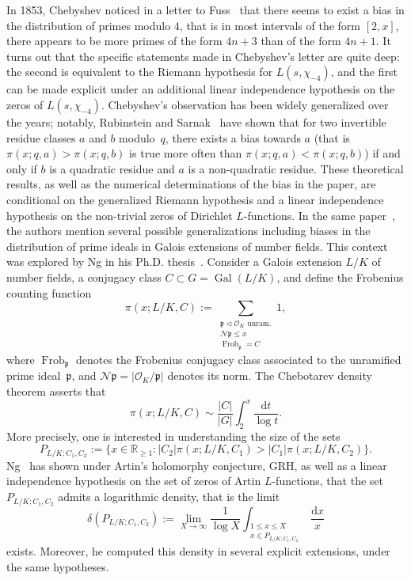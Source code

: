 \documentclass[10pt]{amsart}
\let\mathcal\mathscr
\DeclareMathOperator{\Frob}{Frob}
\theoremstyle{definition}
\DeclareMathOperator{\Gal}{Gal}
\renewcommand{\d}{\mathrm{d}}
\begin{document}
In 1853, Chebyshev noticed in a letter to Fuss~\cite{Ch} that there seems to exist a bias in the distribution of primes modulo $4$, that is in most intervals of the form $[2,x]$, there appears to be more primes of the form $4n+3$ than of the form $4n+1$.
It turns out that the specific statements made in Chebyshev's letter are quite deep: the second is equivalent to the Riemann hypothesis for $L(s,\chi_{-4})$, and the first can be made explicit under an additional linear independence hypothesis on the zeros of $L(s,\chi_{-4})$.
Chebyshev's observation has been widely generalized over the years; notably, Rubinstein and Sarnak~\cite{RS} have shown that for two invertible residue classes $a$ and $b$ modulo~$q$, there exists a bias towards $a$ (that is $\pi(x;q,a)>\pi(x;q,b)$ is true more often than $\pi(x;q,a)<\pi(x;q,b)$) if and only if $b$ is a quadratic residue and $a$ is a non-quadratic residue. These theoretical results, as well as the numerical determinations of the bias in the paper, are conditional on the generalized Riemann hypothesis and a linear independence hypothesis on the non-trivial zeros of Dirichlet $L$-functions. In the same paper~\cite[\S 5]{RS}, the authors mention several possible generalizations including biases in the distribution of prime ideals in Galois extensions of number fields. This context was explored by Ng in his Ph.D. thesis~\cite{Ng}.
Consider a Galois extension $L/K$ of number fields, a conjugacy class $C\subset G= \Gal(L/K)$, and define the Frobenius counting function
\[ \pi(x;L/K,C):=\sum_{\substack{\mathfrak p\triangleleft \mathcal O_K \text{ unram.}\\ \mathcal N\mathfrak p \leq x \\ \Frob_\mathfrak p =C}} 1, \]
where $\Frob_\mathfrak p$ denotes the Frobenius conjugacy class associated to the unramified prime ideal~$\mathfrak p$, and $\mathcal N\mathfrak p= | \mathcal O_K/\mathfrak p|$ denotes its norm.
The Chebotarev density theorem asserts that
\[
\pi(x;L/K,C)\sim \frac{|C|}{|G|} \int_2^x \frac{\d t}{\log t}.
\]
More precisely, one is interested in understanding the size of the sets
\[P_{L/K;C_1,C_2}:=\{ x \in \mathbb R_{\geq 1}\colon |C_2|\pi(x;L/K,C_1) > |C_1|\pi(x;L/K,C_2)\}. \]
Ng~\cite{Ng} has shown under Artin's holomorphy conjecture, GRH, as well as a linear independence hypothesis on the set of zeros of Artin $L$-functions, that the set $P_{L/K;C_1,C_2}$ admits a logarithmic density, that is the limit
\[ \delta(P_{L/K;C_1,C_2}):= \lim_{X\to \infty} \frac 1{\log X} \int_{\substack{ 1\leq x \leq X\\ x\in P_{L/K;C_1,C_2}}} \frac{\d x }{x}\]
exists. Moreover, he computed this density in several explicit extensions, under the same hypotheses.
\end{document}
